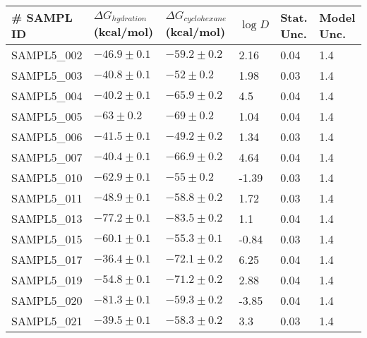 \documentclass{article}
\begin{document}
\begin{table}[]
\centering
\small
\begin{tabular}{|l|l|l|l|l|l|}
\hline
\# SAMPL ID & $\Delta G_{hydration}$ (kcal/mol) & $\Delta G_{cyclohexane}$ (kcal/mol) & $\log D$ & Stat. Unc. & Model Unc. \\ \hline
SAMPL5\_002 & $ -46.9 \pm 0.1 $               & $ -59.2 \pm 0.2 $                   & 2.16     & 0.04       & 1.4        \\ \hline
SAMPL5\_003 & $ -40.8 \pm 0.1 $               & $ -52 \pm 0.2 $                     & 1.98     & 0.03       & 1.4        \\ \hline
SAMPL5\_004 & $ -40.2 \pm 0.1 $               & $ -65.9 \pm 0.2 $                   & 4.5      & 0.04       & 1.4        \\ \hline
SAMPL5\_005 & $ -63 \pm 0.2 $                 & $ -69 \pm 0.2 $                     & 1.04     & 0.04       & 1.4        \\ \hline
SAMPL5\_006 & $ -41.5 \pm 0.1 $               & $ -49.2 \pm 0.2 $                   & 1.34     & 0.03       & 1.4        \\ \hline
SAMPL5\_007 & $ -40.4 \pm 0.1 $               & $ -66.9 \pm 0.2 $                   & 4.64     & 0.04       & 1.4        \\ \hline
SAMPL5\_010 & $ -62.9 \pm 0.1 $               & $ -55 \pm 0.2 $                     & -1.39    & 0.03       & 1.4        \\ \hline
SAMPL5\_011 & $ -48.9 \pm 0.1 $               & $ -58.8 \pm 0.2 $                   & 1.72     & 0.03       & 1.4        \\ \hline
SAMPL5\_013 & $ -77.2 \pm 0.1 $               & $ -83.5 \pm 0.2 $                   & 1.1      & 0.04       & 1.4        \\ \hline
SAMPL5\_015 & $ -60.1 \pm 0.1 $               & $ -55.3 \pm 0.1 $                   & -0.84    & 0.03       & 1.4        \\ \hline
SAMPL5\_017 & $ -36.4 \pm 0.1 $               & $ -72.1 \pm 0.2 $                   & 6.25     & 0.04       & 1.4        \\ \hline
SAMPL5\_019 & $ -54.8 \pm 0.1 $               & $ -71.2 \pm 0.2 $                   & 2.88     & 0.04       & 1.4        \\ \hline
SAMPL5\_020 & $ -81.3 \pm 0.1 $               & $ -59.3 \pm 0.2 $                   & -3.85    & 0.04       & 1.4        \\ \hline
SAMPL5\_021 & $ -39.5 \pm 0.1 $               & $ -58.3 \pm 0.2 $                   & 3.3      & 0.03       & 1.4        \\ \hline

\end{tabular}
\end{table}
\end{document}
